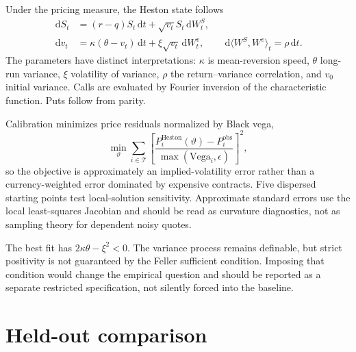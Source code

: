 \documentclass[11pt,oneside]{article}
\newcommand{\dd}{\,\mathrm{d}}
\begin{document}
Under the pricing measure, the Heston state follows
\begin{align}
 \dd S_t &= (r-q)S_t\dd t+\sqrt{v_t}S_t\dd W_t^S,\\
 \dd v_t &= \kappa(\theta-v_t)\dd t+\xi\sqrt{v_t}\dd W_t^v,
 \qquad \dd\langle W^S,W^v\rangle_t=\rho\dd t.
\end{align}
The parameters have distinct interpretations: $\kappa$ is mean-reversion speed,
$\theta$ long-run variance, $\xi$ volatility of variance, $\rho$ the return--variance
correlation, and $v_0$ initial variance. Calls are evaluated by Fourier inversion
of the characteristic function. Puts follow from parity.

Calibration minimizes price residuals normalized by Black vega,
\[
 \min_{\vartheta}\sum_{i\in\mathcal T}
 \left[
 \frac{P_i^{\mathrm{Heston}}(\vartheta)-P_i^{\mathrm{obs}}}
 {\max(\mathrm{Vega}_i,\epsilon)}
 \right]^2,
\]
so the objective is approximately an implied-volatility error rather than a
currency-weighted error dominated by expensive contracts. Five dispersed starting
points test local-solution sensitivity. Approximate standard errors use the local
least-squares Jacobian and should be read as curvature diagnostics, not as sampling
theory for dependent noisy quotes.

\begin{table}[ht]
\centering
\caption{Heston calibration and local curvature uncertainty.}
\resizebox{.82\textwidth}{!}{}
\end{table}

\begin{riskbox}
The best fit has $2\kappa\theta-\xi^2<0$. The variance process remains definable, but
strict positivity is not guaranteed by the Feller sufficient condition. Imposing
that condition would change the empirical question and should be reported as a
separate restricted specification, not silently forced into the baseline.
\end{riskbox}

\section{Held-out comparison}

\begin{table}[ht]
\centering
\caption{Training and held-out errors. The holdout was excluded before calibration.}
\resizebox{\textwidth}{!}{}
\end{table}
\end{document}
